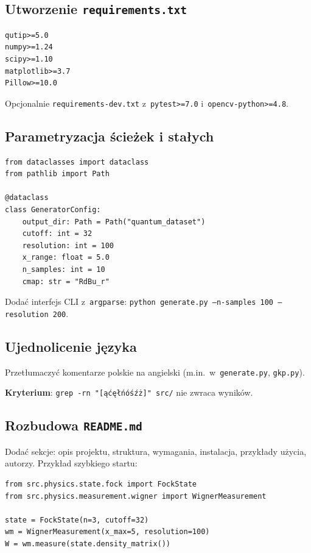 \documentclass[12pt,a4paper]{article}
\begin{document}
\subsection{Utworzenie \texttt{requirements.txt}}

\begin{lstlisting}[style=tree, caption={Proponowany \texttt{requirements.txt}.}, label={lst:requirements}]
qutip>=5.0
numpy>=1.24
scipy>=1.10
matplotlib>=3.7
Pillow>=10.0
\end{lstlisting}

Opcjonalnie \texttt{requirements-dev.txt} z~\texttt{pytest>=7.0} i~\texttt{opencv-python>=4.8}.

\subsection{Parametryzacja ścieżek i stałych}

\begin{lstlisting}[caption={Proponowany plik konfiguracyjny \texttt{config.py}.}, label={lst:config}]
from dataclasses import dataclass
from pathlib import Path

@dataclass
class GeneratorConfig:
    output_dir: Path = Path("quantum_dataset")
    cutoff: int = 32
    resolution: int = 100
    x_range: float = 5.0
    n_samples: int = 10
    cmap: str = "RdBu_r"
\end{lstlisting}

Dodać interfejs CLI z~\texttt{argparse}: \texttt{python generate.py --n-samples 100 --resolution 200}.

\subsection{Ujednolicenie języka}

Przetłumaczyć komentarze polskie na angielski (m.in.~w~\texttt{generate.py}, \texttt{gkp.py}).

\textbf{Kryterium}: \texttt{grep -rn "[ąćęłńóśźż]" src/} nie zwraca wyników.

\subsection{Rozbudowa \texttt{README.md}}

Dodać sekcje: opis projektu, struktura, wymagania, instalacja, przykłady użycia, autorzy. Przykład szybkiego startu:

\begin{lstlisting}[caption={Przykład użycia do umieszczenia w README.}, label={lst:quickstart}]
from src.physics.state.fock import FockState
from src.physics.measurement.wigner import WignerMeasurement

state = FockState(n=3, cutoff=32)
wm = WignerMeasurement(x_max=5, resolution=100)
W = wm.measure(state.density_matrix())
\end{lstlisting}
\end{document}
